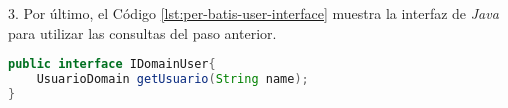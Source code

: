 \par 3. Por último, el Código \ref{lst:per-batis-user-interface} muestra la interfaz de \textit{Java} para utilizar las consultas del paso anterior.
\begin{lstlisting}[language=Java, caption={Interfaz de \textit{Java} para la fábrica de \textit{MyBatis}.}, captionpos=b, label={lst:per-batis-user-interface}]
public interface IDomainUser{
	UsuarioDomain getUsuario(String name);
}
\end{lstlisting}

